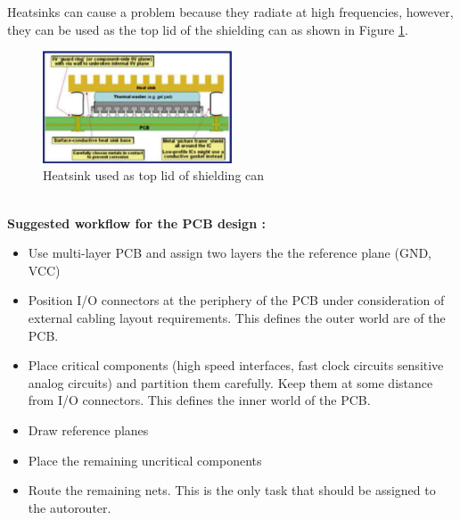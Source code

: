 		Heatsinks can cause a problem because they radiate at high frequencies, however, they can be used as the top lid of the shielding can as shown in Figure \ref{Fig:Heatsink}.
		\begin{figure}[h!]
			\centering
			\includegraphics[width=0.5\textwidth]{images/Heatsink.png}
			\caption{Heatsink used as top lid of shielding can}
			\label{Fig:Heatsink}
		\end{figure}	
		\\
		\textbf{Suggested workflow for the PCB design :}
		\begin{itemize}
			\item Use multi-layer PCB and assign two layers the the reference plane (GND, VCC)
			\item Position I/O connectors at the periphery of the PCB under consideration of external cabling layout requirements. This defines the outer world are of the PCB.
			\item Place critical components (high speed interfaces, fast clock circuits sensitive analog circuits) and partition them carefully. Keep them at some distance from I/O connectors. This defines the inner world of the PCB.
			\item Draw reference planes
			\item Place the remaining uncritical components
			\item Route the remaining nets. This is the only task that should be assigned to the autorouter. 
		\end{itemize}
